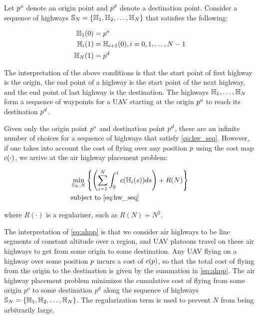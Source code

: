 Let $p^o$ denote an origin point and $p^d$ denote a destination point. Consider a sequence of highways $\mathbb{S}_N = \{\mathbb{H}_1, \mathbb{H}_2, \ldots, \mathbb{H}_N\}$ that satisfies the following:

\begin{equation}
\label{eq:hw_seq}
\begin{aligned}
\mathbb{H}_1(0) &= p^o \\
\mathbb{H}_i(1) &= \mathbb{H}_{i+1}(0), i = 0, 1, \ldots, N-1 \\
\mathbb{H}_N(1) &= p^d \\
\end{aligned}
\end{equation}

The interpretation of the above conditions is that the start point of first highway is the origin, the end point of a highway is the start point of the next highway, and the end point of last highway is the destination. The highways $\mathbb{H}_1,\ldots,\mathbb{H}_N$ form a sequence of waypoints for a UAV starting at the origin $p^o$ to reach its destination $p^d$.

Given only the origin point $p^o$ and destination point $p^d$, there are an infinite number of choices for a sequence of highways that satisfy \eqref{eq:hw_seq}. However, if one takes into account the cost of flying over any position $p$ using the cost map $c(\cdot)$, we arrive at the air highway placement problem:

\begin{equation}
\label{eq:ahpp} %
\begin{aligned}
& \min_{\hws_N, N} \left\{\left(\sum_{i=1}^N \int_0^1 \cmap(\hw_i(s)) ds\right) + R(N)\right\}\\
& \text{subject to \eqref{eq:hw_seq}} 
\end{aligned}
\end{equation}

\noindent where $R(\cdot)$ is a regularizer, such as $R(N) = N^2$. 

The interpretation of \eqref{eq:ahpp} is that we consider air highways to be line segments of constant altitude over a region, and UAV platoons travel on these air highways to get from some origin to some destination. Any UAV flying on a highway over some position $p$ incurs a cost of $c(p)$, so that the total cost of flying from the origin to the destination is given by the summation in \eqref{eq:ahpp}. The air highway placement problem minimizes the cumulative cost of flying from some origin $p^o$ to some destination $p^d$ along the sequence of highways $\mathbb{S}_N=\{\mathbb{H}_1, \mathbb{H}_2, \ldots, \mathbb{H}_N\}$. The regularization term is used to prevent $N$ from being arbitrarily large.


